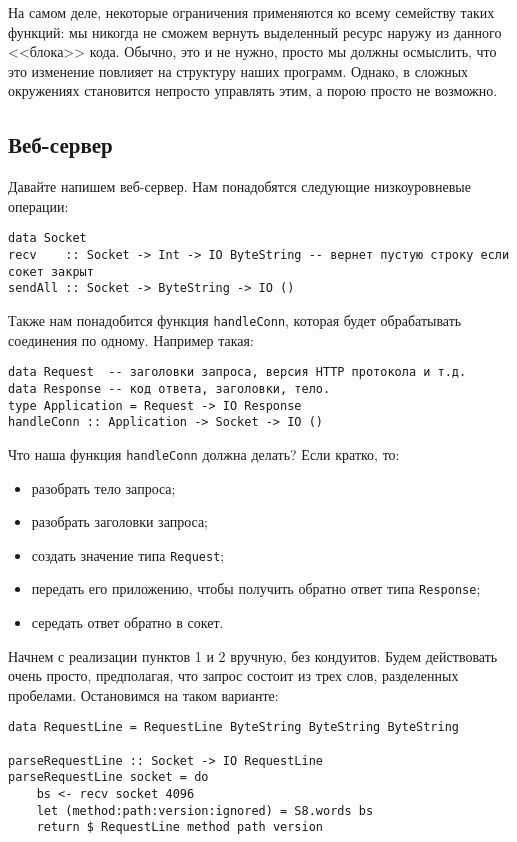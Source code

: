 На самом деле, некоторые ограничения применяются ко всему семейству таких 
функций: мы никогда не сможем вернуть выделенный ресурс наружу из данного 
<<блока>> кода. Обычно, это и не нужно, просто мы должны осмыслить, что это 
изменение повлияет на структуру наших программ. Однако, в сложных окружениях 
становится непросто управлять этим, а порою просто не возможно. 

\subsection{Веб-сервер}
Давайте напишем веб-сервер. Нам понадобятся следующие низкоуровневые операции:
\begin{lstlisting}
data Socket
recv    :: Socket -> Int -> IO ByteString -- вернет пустую строку если сокет закрыт
sendAll :: Socket -> ByteString -> IO ()
\end{lstlisting}
Также нам понадобится функция \lstinline'handleConn', которая будет обрабатывать 
соединения по одному. Например такая:
\begin{lstlisting}
data Request  -- заголовки запроса, версия HTTP протокола и т.д.
data Response -- код ответа, заголовки, тело.
type Application = Request -> IO Response
handleConn :: Application -> Socket -> IO ()
\end{lstlisting}
Что наша функция \lstinline'handleConn' должна делать? Если кратко, то:
\begin{itemize}  
\item   разобрать тело запроса;
\item   разобрать заголовки запроса;
\item   создать значение типа \lstinline'Request';
\item   передать его приложению, чтобы получить обратно ответ типа \lstinline'Response';
\item   середать ответ обратно в сокет.
\end{itemize}  
Начнем с реализации пунктов 1 и 2 вручную, без кондуитов. Будем действовать очень 
просто, предполагая, что запрос состоит из трех слов, разделенных пробелами. 
Остановимся на таком варианте:
\begin{lstlisting}
data RequestLine = RequestLine ByteString ByteString ByteString

parseRequestLine :: Socket -> IO RequestLine
parseRequestLine socket = do
    bs <- recv socket 4096
    let (method:path:version:ignored) = S8.words bs
    return $ RequestLine method path version
\end{lstlisting}
